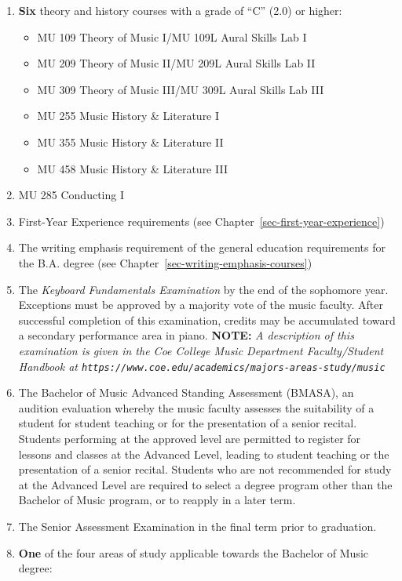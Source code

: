 \documentclass[
  letterpaper,
]{scrbook}
\providecommand{\tightlist}{%
  \setlength{\itemsep}{0pt}\setlength{\parskip}{0pt}}
\begin{document}
\begin{enumerate}
\def\labelenumi{\arabic{enumi}.}
\item
  \textbf{Six} theory and history courses with a grade of ``C'' (2.0) or
  higher:

  \begin{itemize}
  \tightlist
  \item
    MU 109 Theory of Music I/MU 109L Aural Skills Lab I
  \item
    MU 209 Theory of Music II/MU 209L Aural Skills Lab II
  \item
    MU 309 Theory of Music III/MU 309L Aural Skills Lab III
  \item
    MU 255 Music History \& Literature I
  \item
    MU 355 Music History \& Literature II
  \item
    MU 458 Music History \& Literature III
  \end{itemize}
\item
  MU 285 Conducting I
\item
  First-Year Experience requirements (see
  Chapter~\ref{sec-first-year-experience})
\item
  The writing emphasis requirement of the general education requirements
  for the B.A. degree (see Chapter~\ref{sec-writing-emphasis-courses})
\item
  The \emph{Keyboard Fundamentals Examination} by the end of the
  sophomore year. Exceptions must be approved by a majority vote of the
  music faculty. After successful completion of this examination,
  credits may be accumulated toward a secondary performance area in
  piano. \textbf{NOTE:} \emph{A description of this examination is given
  in the Coe College Music Department Faculty/Student Handbook at
  \texttt{https://www.coe.edu/academics/majors-areas-study/music}}
\item
  The Bachelor of Music Advanced Standing Assessment (BMASA), an
  audition evaluation whereby the music faculty assesses the suitability
  of a student for student teaching or for the presentation of a senior
  recital. Students performing at the approved level are permitted to
  register for lessons and classes at the Advanced Level, leading to
  student teaching or the presentation of a senior recital. Students who
  are not recommended for study at the Advanced Level are required to
  select a degree program other than the Bachelor of Music program, or
  to reapply in a later term.\\
\item
  The Senior Assessment Examination in the final term prior to
  graduation.
\item
  \textbf{One} of the four areas of study applicable towards the
  Bachelor of Music degree:


\end{enumerate}
\end{document}
